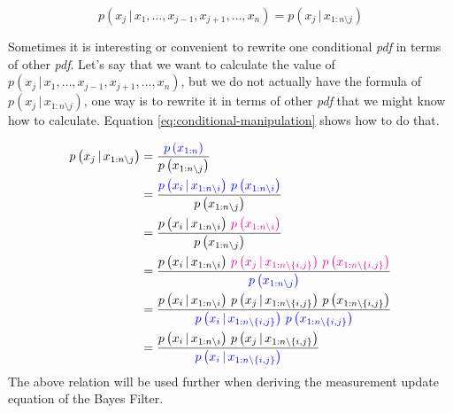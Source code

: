 \documentclass[12pt]{article}
\newcommand{\given}{\,|\,} %
\newcommand{\cbrac}[1]{\left\{#1\right\}} %
\newcommand{\parentheses}[1]{\left(#1\right)}
\newcommand{\pr}[1]{p\parentheses{#1}}
\begin{document}
\begin{equation}
p(x_j \given x_1, \dots, x_{j-1}, x_{j+1}, \dots, x_n) = p\left(x_j \given x_{1:n \setminus j}\right)    
\end{equation}

Sometimes it is interesting or convenient to rewrite one conditional \textit{pdf} in terms of other \textit{pdf}. Let's say that we want to calculate the value of $p(x_j \given x_1, \dots, x_{j-1}, x_{j+1}, \dots, x_n)$, but we do not actually have the formula of $p\left(x_j \given x_{1:n \setminus j}\right)$, one way is to rewrite it in terms of other \textit{pdf} that we might know how to calculate. Equation \ref{eq:conditional-manipulation} shows how to do that.

\begin{equation}
    \begin{aligned}
        \pr{x_j \given x_{1:n \setminus j}} &= \dfrac{\color{blue}\pr{x_{1:n}}}{ \pr{x_{1:n \setminus j}} }\\
        &= \dfrac{\color{blue} \pr{x_i \given x_{1:n \setminus i} } \, \pr{x_{1:n \setminus i} } }{\pr{x_{1:n \setminus j}} } \\
        &= \dfrac{\pr{x_i \given x_{1:n \setminus i} } \, \color{magenta} \pr{x_{1:n \setminus i} } }{\pr{x_{1:n \setminus j}} } \\
        &= \dfrac{\pr{x_i \given x_{1:n \setminus i} }\,\color{magenta} \pr{x_j \given x_{1:n \setminus \cbrac{i, j}} } \, \pr{x_{1:n \setminus \cbrac{i, j}}} }{\color{blue} \pr{x_{1:n \setminus j}}}\\
        &= \dfrac{\pr{x_i \given x_{1:n \setminus i} }\,\pr{x_j \given x_{1:n \setminus \cbrac{i, j}} } \, \pr{x_{1:n \setminus \cbrac{i, j}}} }{\color{blue} \pr{x_i \given x_{1:n \setminus \cbrac{i, j}}} \, \pr{x_{1:n \setminus \cbrac{i, j}}} }\\
        &= \dfrac{\pr{x_i \given x_{1:n \setminus i} }\,\pr{x_j \given x_{1:n \setminus \cbrac{i, j}} } }{\color{blue} \pr{x_i \given x_{1:n \setminus \cbrac{i, j}}} }
    \end{aligned}
    \label{eq:conditional-manipulation}
\end{equation}
The above relation will be used further when deriving the measurement update equation of the Bayes Filter.
\end{document}
